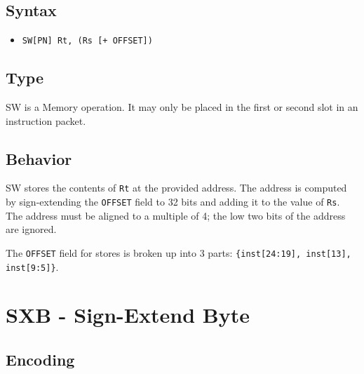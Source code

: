 \documentclass[11pt,openany]{report}
\begin{document}
\subsection{Syntax}

\begin{itemize}
  \item \verb!SW[PN] Rt, (Rs [+ OFFSET])!
\end{itemize}

\subsection{Type}
SW is a Memory operation. It may only be placed in the first or second slot in an instruction packet.

\subsection{Behavior}
SW stores the contents of \texttt{Rt} at the provided address. The address is computed by sign-extending the \texttt{OFFSET} field to 32 bits and adding it to the value of \texttt{Rs}. The address must be aligned to a multiple of 4; the low two bits of the address are ignored.

\noindent
The \texttt{OFFSET} field for stores is broken up into 3 parts: \verb#{inst[24:19], inst[13], inst[9:5]}#.


\pagebreak
\section{SXB - Sign-Extend Byte}

\subsection{Encoding}
\end{document}

